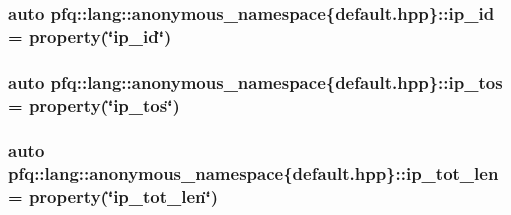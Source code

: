 \hypertarget{namespacepfq_1_1lang_1_1anonymous__namespace_02default_8hpp_03_a87620275a9e9760978d5660be0582852}{
\subsubsection[{ip\+\_\+id}]{\setlength{\rightskip}{0pt plus 5cm}auto pfq\+::lang\+::anonymous\+\_\+namespace\{default.\+hpp\}\+::ip\+\_\+id = {\bf property}(\char`\"{}ip\+\_\+id\char`\"{})}}\label{namespacepfq_1_1lang_1_1anonymous__namespace_02default_8hpp_03_a87620275a9e9760978d5660be0582852}
\hypertarget{namespacepfq_1_1lang_1_1anonymous__namespace_02default_8hpp_03_acc5d2b786c39d4177ab37ee16ee2295d}{
\subsubsection[{ip\+\_\+tos}]{\setlength{\rightskip}{0pt plus 5cm}auto pfq\+::lang\+::anonymous\+\_\+namespace\{default.\+hpp\}\+::ip\+\_\+tos = {\bf property}(\char`\"{}ip\+\_\+tos\char`\"{})}}\label{namespacepfq_1_1lang_1_1anonymous__namespace_02default_8hpp_03_acc5d2b786c39d4177ab37ee16ee2295d}
\hypertarget{namespacepfq_1_1lang_1_1anonymous__namespace_02default_8hpp_03_a48d42ce1bea31f55be3377e8f2c41bbe}{
\subsubsection[{ip\+\_\+tot\+\_\+len}]{\setlength{\rightskip}{0pt plus 5cm}auto pfq\+::lang\+::anonymous\+\_\+namespace\{default.\+hpp\}\+::ip\+\_\+tot\+\_\+len = {\bf property}(\char`\"{}ip\+\_\+tot\+\_\+len\char`\"{})}}\label{namespacepfq_1_1lang_1_1anonymous__namespace_02default_8hpp_03_a48d42ce1bea31f55be3377e8f2c41bbe}
